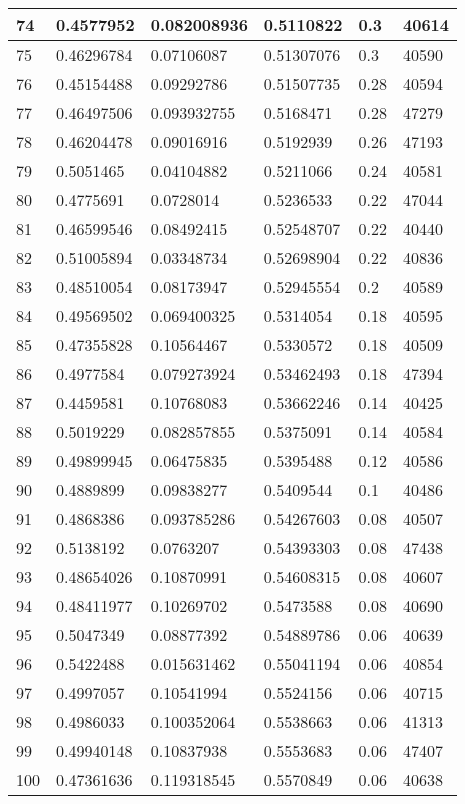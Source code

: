 \begin{longtable}{|l|l|l|l|l|l|}
74 & 0.4577952 & 0.082008936 & 0.5110822 & 0.3 & 40614 \\ \hline 
75 & 0.46296784 & 0.07106087 & 0.51307076 & 0.3 & 40590 \\ \hline 
76 & 0.45154488 & 0.09292786 & 0.51507735 & 0.28 & 40594 \\ \hline 
77 & 0.46497506 & 0.093932755 & 0.5168471 & 0.28 & 47279 \\ \hline 
78 & 0.46204478 & 0.09016916 & 0.5192939 & 0.26 & 47193 \\ \hline 
79 & 0.5051465 & 0.04104882 & 0.5211066 & 0.24 & 40581 \\ \hline 
80 & 0.4775691 & 0.0728014 & 0.5236533 & 0.22 & 47044 \\ \hline 
81 & 0.46599546 & 0.08492415 & 0.52548707 & 0.22 & 40440 \\ \hline 
82 & 0.51005894 & 0.03348734 & 0.52698904 & 0.22 & 40836 \\ \hline 
83 & 0.48510054 & 0.08173947 & 0.52945554 & 0.2 & 40589 \\ \hline 
84 & 0.49569502 & 0.069400325 & 0.5314054 & 0.18 & 40595 \\ \hline 
85 & 0.47355828 & 0.10564467 & 0.5330572 & 0.18 & 40509 \\ \hline 
86 & 0.4977584 & 0.079273924 & 0.53462493 & 0.18 & 47394 \\ \hline 
87 & 0.4459581 & 0.10768083 & 0.53662246 & 0.14 & 40425 \\ \hline 
88 & 0.5019229 & 0.082857855 & 0.5375091 & 0.14 & 40584 \\ \hline 
89 & 0.49899945 & 0.06475835 & 0.5395488 & 0.12 & 40586 \\ \hline 
90 & 0.4889899 & 0.09838277 & 0.5409544 & 0.1 & 40486 \\ \hline 
91 & 0.4868386 & 0.093785286 & 0.54267603 & 0.08 & 40507 \\ \hline 
92 & 0.5138192 & 0.0763207 & 0.54393303 & 0.08 & 47438 \\ \hline 
93 & 0.48654026 & 0.10870991 & 0.54608315 & 0.08 & 40607 \\ \hline 
94 & 0.48411977 & 0.10269702 & 0.5473588 & 0.08 & 40690 \\ \hline 
95 & 0.5047349 & 0.08877392 & 0.54889786 & 0.06 & 40639 \\ \hline 
96 & 0.5422488 & 0.015631462 & 0.55041194 & 0.06 & 40854 \\ \hline 
97 & 0.4997057 & 0.10541994 & 0.5524156 & 0.06 & 40715 \\ \hline 
98 & 0.4986033 & 0.100352064 & 0.5538663 & 0.06 & 41313 \\ \hline 
99 & 0.49940148 & 0.10837938 & 0.5553683 & 0.06 & 47407 \\ \hline 
100 & 0.47361636 & 0.119318545 & 0.5570849 & 0.06 & 40638 \\ \hline 
\end{longtable}